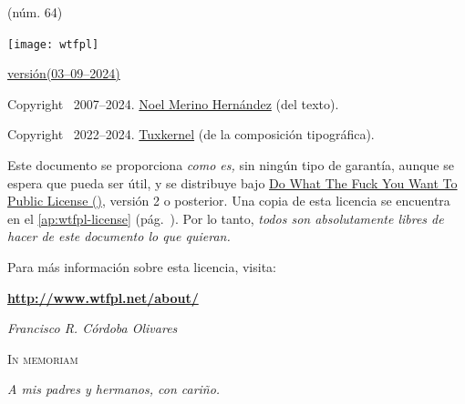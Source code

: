 \documentclass[14pt,twoside,final]{extbook} %
\providecommand\phantomsection{} %
\begin{document}
\begin{center}
(núm. 64)
\end{center}
\newpage
\thispagestyle{empty}
\vspace*{0pt}
\vfill
\protect\phantomsection
{}
\begin{scriptsize}
\begin{flushleft}
\begin{minipage}{7.5cm}
\texttt{[image: wtfpl]}\phantomsection\label{fig:wtfpl} \protect\medskip

\def\fileversion{1.047}
\def\filedate{(03--09--2024)}
\href{https://tuxkernel.github.io/tx/dl/cv.txt}{versión\space\fileversion\space\filedate} \protect\medskip

Copyright \textcopyright\ 2007--2024. \href{noel_merino@yahoo.com.mx}{Noel Merino Hernández} (del texto).

Copyright \textcopyright\ 2022--2024. \href{muxkernel@gmail.com}{Tuxkernel} (de la composición tipográfica). \protect\medskip

Este documento se proporciona \emph{como es,} sin ningún tipo de garantía, aunque se espera que pueda ser útil, y se distribuye bajo \href{http://www.wtfpl.net/}{Do What The Fuck You Want To Public License ()}, versión 2 o posterior. Una copia de esta licencia se encuentra en el \autoref{ap:wtfpl-license} (pág.~\pageref{ap:wtfpl-license}). Por lo tanto, \emph{todos son absolutamente libres de hacer de este documento lo que quieran.} \protect\medskip

Para más información sobre esta licencia, visita: \protect\medskip

\textbf{\url{http://www.wtfpl.net/about/}}
\end{minipage}
\end{flushleft}
\end{scriptsize}
\newpage
\pagestyle{empty}
\phantomsection
{}
\vspace*{48pt}
\begin{flushright}
\textit{Francisco R. Córdoba Olivares}
\end{flushright}
\begin{flushright}
\textsc{In memoriam}
\end{flushright}
\protect\smallskip
\begin{flushright}
\textit{A mis padres y hermanos, con cariño.}
\end{flushright}
\newpage
\pagestyle{empty}
\newpage
\pagestyle{empty}
\end{document}
